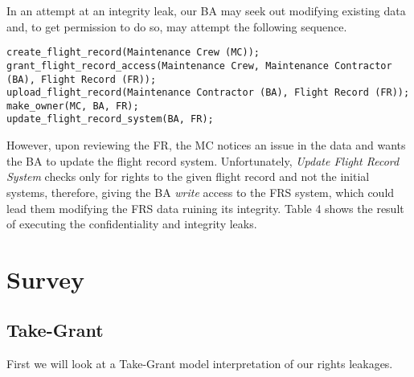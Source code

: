 \documentclass[10pt,journal,compsoc]{IEEEtran}
\begin{document}
  In an attempt at an integrity leak, our BA may seek out modifying existing data and, to get permission to do so, may attempt the following sequence. 

\begin{lstlisting}
create_flight_record(Maintenance Crew (MC));
grant_flight_record_access(Maintenance Crew, Maintenance Contractor (BA), Flight Record (FR));
upload_flight_record(Maintenance Contractor (BA), Flight Record (FR));
make_owner(MC, BA, FR);
update_flight_record_system(BA, FR);
\end{lstlisting}  

  However, upon reviewing the FR, the MC notices an issue in the data and wants the BA to update the flight record system. 
  Unfortunately, \textit{Update Flight Record System} checks only for rights to the given flight record and not the initial systems, therefore, giving the BA \textit{write} access to the FRS system, which could lead them modifying the FRS data ruining its integrity.
  Table 4 shows the result of executing the confidentiality and integrity leaks. 

\section{Survey}

\subsection{Take-Grant}

First we will look at a Take-Grant model interpretation of our rights leakages. 
\end{document}
